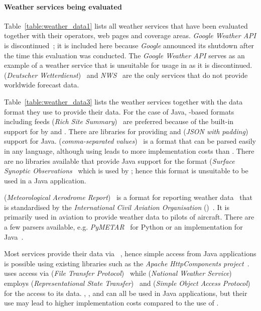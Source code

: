 \paragraph{Weather services being evaluated}

Table~\ref{table:weather_data1} lists all weather services that have been evaluated together with their operators, web pages and coverage areas. \emph{Google Weather API} is discontinued~\cite{google_weather}; it is included here because \emph{Google} announced its shutdown after the time this evaluation was conducted. The \emph{Google Weather \acs{API}} serves as an example of a weather service that is unsuitable for usage in \smarthomeweather as it is discontinued.  (\emph{Deutscher Wetterdienst})~\cite{dwd} and \emph{NWS}~\cite{nws} are the only services that do not provide worldwide forecast data.

Table~\ref{table:weather_data3} lists the  weather services together with the data format they use to provide their data. For the case of Java, -based formats including  feeds (\emph{Rich Site Summary})~\cite{RSS} are preferred because of the built-in support for  by  and . There are libraries for providing  and  (\emph{\acs{JSON} with padding})~\cite{jsonp} support for Java.  (\emph{comma-separated values})~\cite{rfc4180} is a format that can be parsed easily in any language, although using  leads to more implementation costs than . There are no libraries available that provide Java support for the  format (\emph{Surface Synoptic Observations}~\cite{SYNOP} which is used by ; hence this format is unsuitable to be used in a Java application.

 (\emph{Meteorological Aerodrome Report})~\cite{metar} is a format for reporting weather data~\cite{metar} that is standardised by the \emph{International Civil Aviation Organisation} ()~\cite{ICAO}. It is primarily used in aviation to provide weather data to pilots of aircraft. There are a few parsers available, e.g. \emph{PyMETAR}~\cite{pymetar} for Python or an implementation for Java~\cite{metar-java}.

Most services provide their data via ~\cite{rfc2616}, hence simple access from Java applications is possible using existing libraries such as the \emph{Apache HttpComponents project}~\cite{apache_hc}.  uses access via  (\emph{File Transfer Protocol})~\cite{rfc959} while  (\emph{National Weather Service}) employs  (\emph{Representational State Transfer})~\cite{REST} and  (\emph{Simple Object Access Protocol})~\cite{SOAP} for the access to its data. , , and  can all be used in Java applications, but their use may lead to higher implementation costs compared to the use of .

